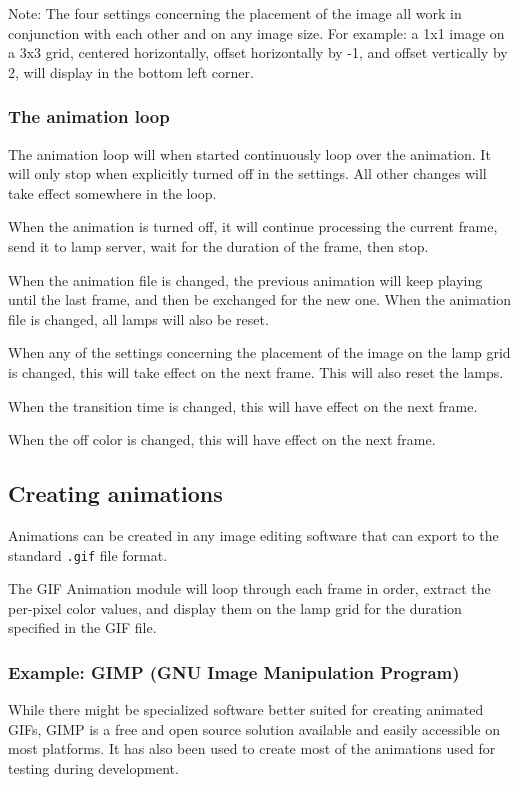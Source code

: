 Note: The four settings concerning the placement of the image all work in
conjunction with each other and on any image size. For example: a 1x1 image on
a 3x3 grid, centered horizontally, offset horizontally by -1, and offset
vertically by 2, will display in the bottom left corner.


\subsubsection{The animation loop}

The animation loop will when started continuously loop over the animation.
It will only stop when explicitly turned off in the settings. All other changes
will take effect somewhere in the loop.

When the animation is turned off, it will continue processing the current frame,
send it to lamp server, wait for the duration of the frame, then stop.

When the animation file is changed, the previous animation will keep playing until
the last frame, and then be exchanged for the new one. When the animation file is
changed, all lamps will also be reset.

When any of the settings concerning the placement of the image on the lamp grid is
changed, this will take effect on the next frame. This will also reset the lamps.

When the transition time is changed, this will have effect on the next frame.

When the off color is changed, this will have effect on the next frame.


\subsection{Creating animations}
Animations can be created in any image editing software that can export to the
standard \texttt{.gif} file format.

The GIF Animation module will loop through each frame in order, extract the
per-pixel color values, and display them on the lamp grid for the duration
specified in the GIF file.


\subsubsection{Example: GIMP (GNU Image Manipulation Program)}
While there might be specialized software better suited for creating animated GIFs,
GIMP is a free and open source solution available and easily accessible on most platforms.
It has also been used to create most of the animations used for testing during development.

